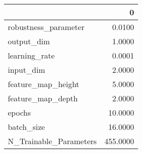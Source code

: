 \begin{tabular}{lr}
\toprule
{} &         0 \\
\midrule
robustness\_parameter   &    0.0100 \\
output\_dim             &    1.0000 \\
learning\_rate          &    0.0001 \\
input\_dim              &    2.0000 \\
feature\_map\_height     &    5.0000 \\
feature\_map\_depth      &    2.0000 \\
epochs                 &   10.0000 \\
batch\_size             &   16.0000 \\
N\_Trainable\_Parameters &  455.0000 \\
\bottomrule
\end{tabular}

